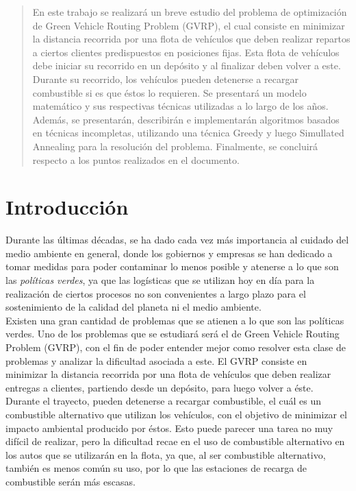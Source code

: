 \documentclass[letter, 10pt]{article}
\begin{document}
\begin{abstract}

En este trabajo se realizará un breve estudio del problema de optimización de Green Vehicle Routing Problem (GVRP), el cual consiste en minimizar la distancia recorrida por una flota de vehículos que deben realizar repartos a ciertos clientes predispuestos en posiciones fijas. Esta flota de vehículos debe iniciar su recorrido en un depósito y al finalizar deben volver a este. Durante su recorrido, los vehículos pueden detenerse a recargar combustible si es que éstos lo requieren. Se presentará un modelo matemático y sus respectivas técnicas utilizadas a lo largo de los años. Además, se presentarán, describirán e implementarán algoritmos basados en técnicas incompletas, utilizando una técnica Greedy y luego Simullated Annealing para la resolución del problema. Finalmente, se concluirá respecto a los puntos realizados en el documento.
\end{abstract}

\section{Introducci\'on}


Durante las últimas décadas, se ha dado cada vez más importancia al cuidado del medio ambiente en general, donde los gobiernos y empresas se han dedicado a tomar medidas para poder contaminar lo menos posible y atenerse a lo que son las \emph{políticas verdes}, ya que las logísticas que se utilizan hoy en día para la realización de ciertos procesos no son convenientes a largo plazo para el sostenimiento de la calidad del planeta ni el medio ambiente.
\\

Existen una gran cantidad de problemas que se atienen a lo que son las políticas verdes. Uno de los problemas que se estudiará será el de Green Vehicle Routing Problem (GVRP), con el fin de poder entender mejor como resolver esta clase de problemas y analizar la dificultad asociada a este. El GVRP consiste en minimizar la distancia recorrida por una flota de vehículos que deben realizar entregas a clientes, partiendo desde un depósito, para luego volver a éste. Durante el trayecto, pueden detenerse a recargar combustible, el cuál es un combustible alternativo que utilizan los vehículos, con el objetivo de minimizar el impacto ambiental producido por éstos. Esto puede parecer una tarea no muy difícil de realizar, pero la dificultad recae en el uso de combustible alternativo en los autos que se utilizarán en la flota, ya que, al ser combustible alternativo, también es menos común su uso, por lo que las estaciones de recarga de combustible serán más escasas.
\\
\end{document}
